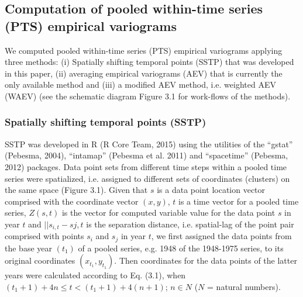 \subsection{Computation of pooled within-time series (PTS) empirical variograms}
\label{Computation of pooled within-time series (PTS) empirical variograms}

We computed pooled within-time series (PTS) empirical variograms applying three methods: (i) Spatially shifting temporal points (SSTP) that was developed in this paper, (ii) averaging empirical variograms (AEV) that is currently the only available method and (iii) a modified AEV method, i.e. weighted AEV (WAEV) (see the schematic diagram Figure 3.1 for work-flows of the methods).

\subsubsection{Spatially shifting temporal points (SSTP)}
\label{Spatially shifting temporal points (SSTP)}

SSTP was developed in R (R Core Team, 2015) using the utilities of the “gstat” (Pebesma, 2004), “intamap” (Pebesma et al. 2011) and “spacetime” (Pebesma, 2012) packages. Data point sets from different time steps within a pooled time series were spatialized, i.e. assigned to different sets of coordinates (clusters) on the same space (Figure 3.1). Given that $s$ is a data point location vector comprised with the coordinate vector $(x,y)$, $t$ is a time vector for a pooled time series, $Z(s,t)$ is the vector for computed variable value for the data point $s$ in year $t$ and $||s_{i,t}-s{j,t}$  is the separation distance, i.e. spatial-lag of the point pair comprised with points $s_i$ and $s_j$ in year $t$, we first assigned the data points from the base year $(t_1)$ of a pooled series, e.g. 1948 of the 1948-1975 series, to its original coordinates $(x_{t_1},y_{t_1})$. Then coordinates for the data points of the latter years were calculated according to Eq. (3.1), when  $(t_1+1)+4n \leq t < (t_1+1)+4(n+1)$; $n \in N$ ($N$ = natural numbers).

